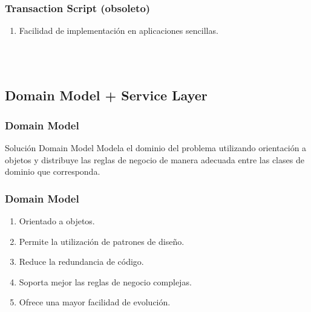 \documentclass[handout,a4paper,slidestop,xcolor=pst,blue]{beamer}
\begin{document}
\begin{frame}[c]
    \frametitle{Transaction Script (obsoleto)}
    \begin{enumerate}
        \item<2-> Facilidad de implementación en aplicaciones sencillas.
    \end{enumerate}
    \ \\ \ \\
\end{frame}

\subsection{Domain Model + Service Layer}

\begin{frame}[c]
    \frametitle{Domain Model}
    \begin{block}{Solución Domain Model}
        Modela el dominio del problema utilizando orientación a objetos y distribuye las reglas de negocio de manera adecuada entre las clases de dominio que corresponda.
    \end{block}
\end{frame}

\begin{frame}[c]
    \frametitle{Domain Model}
    \begin{enumerate}
        \item<2-> Orientado a objetos.
        \item<3-> Permite la utilización de patrones de diseño.
        \item<4-> Reduce la redundancia de código.
        \item<5-> Soporta mejor las reglas de negocio complejas.
        \item<6-> Ofrece una mayor facilidad de evolución.
    \end{enumerate}
    \ \\ \ \\
\end{frame}
\end{document}
